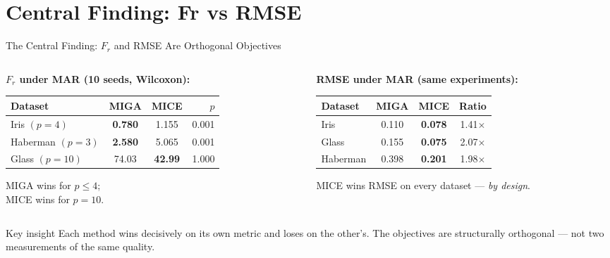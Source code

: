 \documentclass[aspectratio=169,12pt]{beamer}
\newcommand{\MIGA}{\textsc{MIGA}}
\newcommand{\MICE}{\textsc{MICE}}
\begin{document}
\section{Central Finding: Fr vs RMSE}

\begin{frame}{The Central Finding: $F_r$ and RMSE Are Orthogonal Objectives}

\begin{columns}
\begin{column}{0.5\textwidth}
\textbf{$F_r$ under MAR (10 seeds, Wilcoxon):}

\renewcommand{\arraystretch}{1.2}
\begin{tabular}{lccr}
\toprule
Dataset & \MIGA{} & \MICE{} & $p$ \\
\midrule
Iris $(p=4)$     & \textbf{0.780} & 1.155 & 0.001 \\
Haberman $(p=3)$ & \textbf{2.580} & 5.065 & 0.001 \\
Glass $(p=10)$   & 74.03 & \textbf{42.99} & 1.000 \\
\bottomrule
\end{tabular}

\bigskip
\MIGA{} wins for $p \leq 4$; \\
\MICE{} wins for $p = 10$.
\end{column}

\begin{column}{0.5\textwidth}
\textbf{RMSE under MAR (same experiments):}

\renewcommand{\arraystretch}{1.2}
\begin{tabular}{lccc}
\toprule
Dataset & \MIGA{} & \MICE{} & Ratio \\
\midrule
Iris     & 0.110 & \textbf{0.078} & 1.41$\times$ \\
Glass    & 0.155 & \textbf{0.075} & 2.07$\times$ \\
Haberman & 0.398 & \textbf{0.201} & 1.98$\times$ \\
\bottomrule
\end{tabular}

\bigskip
\MICE{} wins RMSE on every dataset — \emph{by design}.
\end{column}
\end{columns}

\bigskip
\begin{block}{Key insight}
Each method wins decisively on its own metric and loses on the other's. The objectives are \alert{structurally orthogonal} — not two measurements of the same quality.
\end{block}

\end{frame}
\end{document}
